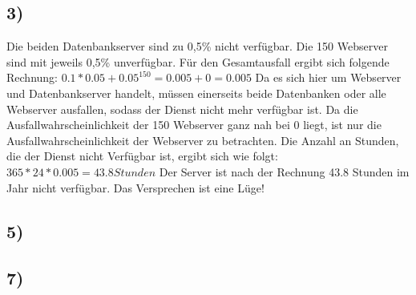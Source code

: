 \documentclass[ngerman]{fbi-aufgabenblatt}
\begin{document}
	\setcounter{section}{0}


	\subsection*{3)}
  Die beiden Datenbankserver sind zu 0,5\% nicht verfügbar. Die 150 Webserver
	sind mit jeweils 0,5\% unverfügbar.
	Für den Gesamtausfall ergibt sich folgende Rechnung: \newline
	$0.1* 0.05 + {0.05}^{150} = 0.005 + 0 = 0.005$ \newline
	Da es sich hier um Webserver und Datenbankserver handelt, müssen einerseits
	beide Datenbanken
	oder alle Webserver ausfallen, sodass der Dienst nicht mehr verfügbar ist.
	Da die Ausfallwahrscheinlichkeit der 150 Webserver ganz nah bei 0 liegt, ist
	nur die Ausfallwahrscheinlichkeit der Webserver zu betrachten.
	\newline
	Die Anzahl an Stunden, die der Dienst nicht Verfügbar ist, ergibt sich wie folgt: \newline
	$365 * 24 * 0.005 = 43.8 Stunden$ \newline
	Der Server ist nach der Rechnung 43.8 Stunden im Jahr nicht verfügbar.
	Das Versprechen ist eine Lüge!
	
	\subsection*{5)}

	
	\subsection*{7)}
\end{document}
